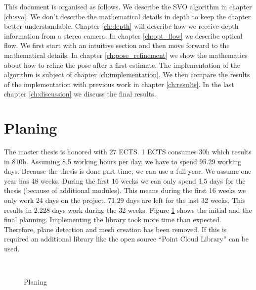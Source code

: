 \documentclass[11pt,a4paper,titlepage,oneside]{report}
\begin{document}
This document is organised as follows. We describe the SVO algorithm in chapter \ref{ch:svo}. We don't describe the mathematical details in depth to keep the chapter better understandable. Chapter \ref{ch:depth} will describe how we receive depth information from a stereo camera. In chapter \ref{ch:opt_flow} we describe optical flow. We first start with an intuitive section and then move forward to the mathematical details. In chapter \ref{ch:pose_refinement} we show the mathematics about how to refine the pose after a first estimate. The implementation of the algorithm is subject of chapter \ref{ch:implementation}. We then compare the results of the implementation with previous work in chapter \ref{ch:results}. In the last chapter \ref{ch:discussion} we discuss the final results.

\section{Planing}
The master thesis is honored with 27 ECTS. 1 ECTS consumes 30h which results in 810h. Assuming 8.5 working hours per day, we have to spend 95.29 working days. Because the thesis is done part time, we can use a full year. We assume one year has 48 weeks. During the first 16 weeks we can only spend 1.5 days for the thesis (because of additional modules). This means during the first 16 weeks we only work 24 days on the project. 71.29 days are left for the last 32 weeks. This results in 2.228 days work during the 32 weeks. Figure \ref{fig:gantt} shows the initial and the final planning. Implementing the library took more time than expected. Therefore, plane detection and mesh creation has been removed. If this is required an additional library like the open source ``Point Cloud Library'' \cite{pcl} can be used.

\begin{figure}[H]
  \\
  \caption{Planing}\label{fig:gantt}
\end{figure}
\end{document}
